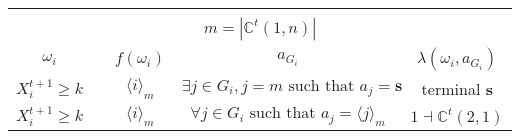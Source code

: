 \documentclass[12pt,letter]{article}
\newcommand{\Kappa}{\mathbb{C}}
\theoremstyle{definition}
\theoremstyle{definition}
\theoremstyle{remark}
\theoremstyle{claim}
\begin{document}
\begin{table}[!htbp]
\begin{center}
\begin{tabular}{c c | c | c | c}
\hline
\\
\multicolumn{5}{c}{$m= |\Kappa^t(1,n)|$}\\
$\omega_i$ 	 & 	   &	$f(\omega_i)$  &	$a_{G_i}$ & $\lambda(\omega_i,a_{G_i})$ \\
\hline
\hline
$X^{t+1}_i\geq k$ 	& 						& $\langle i \rangle_m$		&  $\exists j\in G_i, j=m\text{ such that } a_j=\textbf{s}$	& terminal \textbf{s}\\
$X^{t+1}_i\geq k$ 	& 						& $\langle i \rangle_m$		&  $\forall j\in G_i\text{ such that } a_j= \langle j \rangle_m$	& $1\dashv \Kappa^t(2,1)$\\
\hline
\end{tabular}
\end{center}
\end{table}


\clearpage
\end{document}
